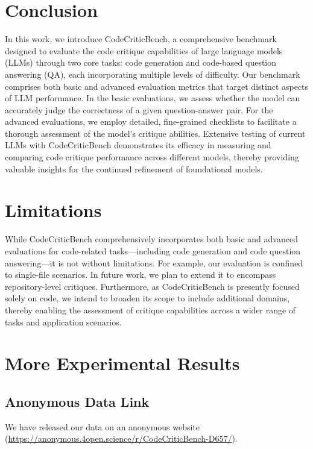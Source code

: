 \documentclass[11pt, a4paper, logo, copyright, nonumbering, amsart]{map}
\begin{document}
\begin{CJK*}{UTF8}{gbsn}
\section{Conclusion}

In this work, we introduce CodeCriticBench, a comprehensive benchmark designed to evaluate the code critique capabilities of large language models (LLMs) through two core tasks: code generation and code-based question answering (QA), each incorporating multiple levels of difficulty. Our benchmark comprises both basic and advanced evaluation metrics that target distinct aspects of LLM performance. In the basic evaluations, we assess whether the model can accurately judge the correctness of a given question-answer pair. For the advanced evaluations, we employ detailed, fine-grained checklists to facilitate a thorough assessment of the model’s critique abilities. Extensive testing of current LLMs with CodeCriticBench demonstrates its efficacy in measuring and comparing code critique performance across different models, thereby providing valuable insights for the continued refinement of foundational models.

\section*{Limitations}

While CodeCriticBench comprehensively incorporates both basic and advanced evaluations for code-related tasks—including code generation and code question answering—it is not without limitations. For example, our evaluation is confined to single-file scenarios. In future work, we plan to extend it to encompass repository-level critiques. Furthermore, as CodeCriticBench is presently focused solely on code, we intend to broaden its scope to include additional domains, thereby enabling the assessment of critique capabilities across a wider range of tasks and application scenarios.

\clearpage



\clearpage

\appendix

\section{More Experimental Results}

\subsection{Anonymous Data Link}
We have released our data on an anonymous website (\url{https://anonymous.4open.science/r/CodeCriticBench-D657/}).


\end{CJK*}
\end{document}
